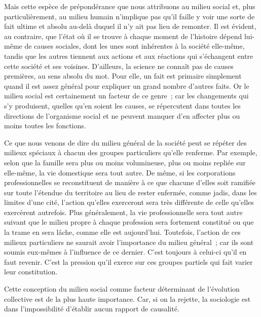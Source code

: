 \documentclass[french,twoside]{book} %
\begin{document}
Mais cette espèce de prépondérance que nous attribuons au milieu social et, plus particulièrement, au milieu humain n’implique pas qu’il faille y voir une sorte de fait ultime et absolu au-delà duquel il n’y ait pas lieu de remonter. Il est évident, au contraire, que l’état où il se trouve à chaque moment de l’histoire dépend lui-même de causes sociales, dont les unes sont inhérentes à la société elle-même, tandis que les autres tiennent aux actions et aux réactions qui s’échangent entre cette société et ses voisines. D’ailleurs, la science ne connaît pas de causes premières, au sens absolu du mot. Pour elle, un fait est primaire simplement quand il est assez général pour expliquer un grand nombre d’autres faits. Or le milieu social est certainement un facteur de ce genre ; car les changements qui s’y produisent, quelles qu’en soient les causes, se répercutent dans toutes les directions de l’organisme social et ne peuvent manquer d’en affecter plus ou moins toutes les fonctions.\par
Ce que nous venons de dire du milieu général de la société peut se répéter des milieux spéciaux à chacun des groupes particuliers qu’elle renferme. Par exemple, selon que la famille sera plus ou moins volumineuse, plus ou moins repliée sur elle-même, la vie domestique sera tout autre. De même, si les corporations professionnelles se reconstituent de manière à ce que chacune d’elles soit ramifiée sur toute l’étendue du territoire au lieu de rester enfermée, comme jadis, dans les limites d’une cité, l’action qu’elles exerceront sera très différente de celle qu’elles exercèrent autrefois. Plus généralement, la vie professionnelle sera tout autre suivant que le milieu propre à chaque profession sera fortement constitué ou que la trame en sera lâche, comme elle est aujourd’hui. Toutefois, l’action de ces milieux particuliers ne saurait avoir l’importance du milieu général ; car ils sont soumis eux-mêmes à l’influence de ce dernier. C’est toujours à celui-ci qu’il en faut revenir. C’est la pression qu’il exerce sur ces groupes partiels qui fait varier leur constitution.\par
Cette conception du milieu social comme facteur déterminant de l’évolution collective est de la plus haute importance. Car, si on la rejette, la sociologie est dans l’impossibilité d’établir aucun rapport de causalité.\par
\end{document}
